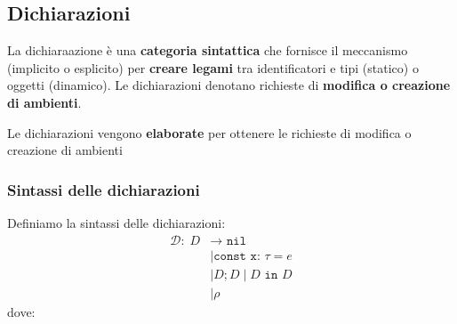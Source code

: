 \documentclass[a4paper]{article}
\begin{document}
\subsection{Dichiarazioni}
La dichiaraazione è una \textbf{categoria sintattica} che fornisce il meccanismo (implicito
o esplicito) per \textbf{creare legami} tra identificatori e tipi (statico) o oggetti
(dinamico). Le dichiarazioni denotano richieste di 
\textbf{modifica o creazione di ambienti}.

\vspace{1em}
\noindent
Le dichiarazioni vengono \textbf{elaborate} per ottenere le richieste di modifica o
creazione di ambienti

\subsubsection{Sintassi delle dichiarazioni}
Definiamo la sintassi delle dichiarazioni:
\[
  \begin{aligned}
    \mathcal{D}: \; D & \to  \texttt{ nil}  \\
                      & \mid \texttt{const x: } \tau = e  \\
                      & \mid D; D  \mid D \texttt{ in } D \\
                      & \mid \rho 
  \end{aligned}
\] 
dove:
\end{document}
